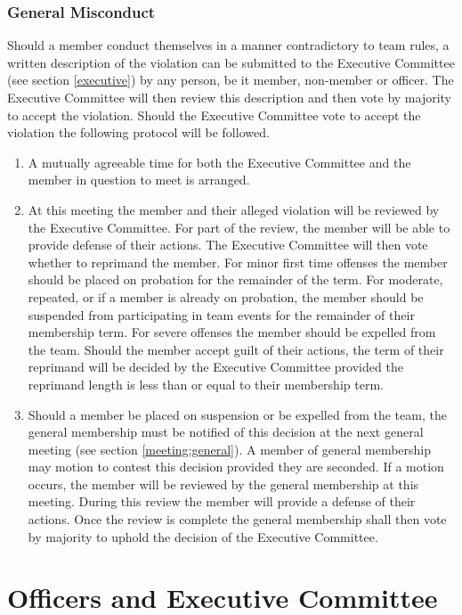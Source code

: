 \documentclass[12pt,titlepage,letter]{article}
\begin{document}
\subsubsection{General Misconduct \label{member:misconduct:general}}
Should a member conduct themselves in a manner contradictory to team rules, a written description of the violation can be submitted to the Executive Committee (see section \ref{executive}) by any person, be it member, non-member or officer. The Executive Committee will then review this description and then vote by majority to accept the violation. Should the Executive Committee vote to accept the violation the following protocol will be followed.
\begin{enumerate}
\item
A mutually agreeable time for both the Executive Committee and the member in question to meet is arranged.
\item
At this meeting the member and their alleged violation will be reviewed by the Executive Committee. For part of the review, the member will be able to provide defense of their actions. The Executive Committee will then vote whether to reprimand the member. For minor first time offenses the member should be placed on probation for the remainder of the term. For moderate, repeated, or if a member is already on probation, the member should be suspended from participating in team events for the remainder of their membership term. For severe offenses the member should be expelled from the team. Should the member accept guilt of their actions, the term of their reprimand will be decided by the Executive Committee provided the reprimand length is less than or equal to their membership term.
\item
Should a member be placed on suspension or be expelled from the team, the general membership must be notified of this decision at the next general meeting (see section \ref{meeting:general}). A member of general membership may motion to contest this decision provided they are seconded. If a motion occurs, the member will be reviewed by the general membership at this meeting. During this review the member will provide a defense of their actions. Once the review is complete the general membership shall then vote by majority to uphold the decision of the Executive Committee.
\end{enumerate}

\section{Officers and Executive Committee \label{executive}}
\end{document}
